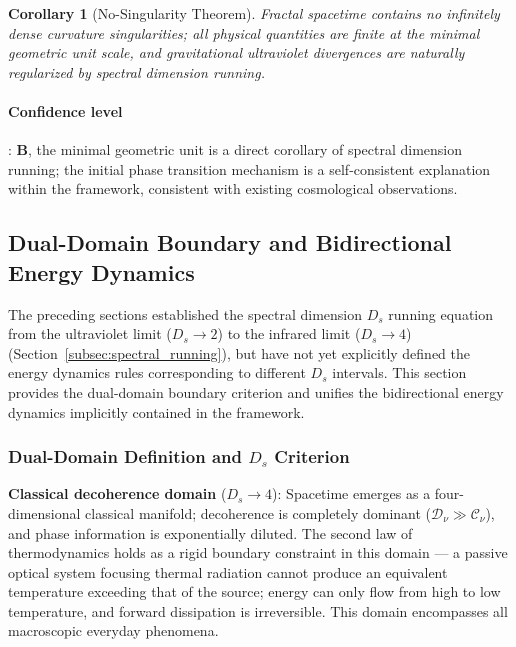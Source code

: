 \documentclass[12pt,a4paper,twocolumn]{article}
\newtheorem{corollary}[theorem]{Corollary}
\begin{document}
\begin{corollary}[No-Singularity Theorem]
Fractal spacetime contains no infinitely dense curvature singularities; all physical quantities are finite at the minimal geometric unit scale, and gravitational ultraviolet divergences are naturally regularized by spectral dimension running.
\end{corollary}

\paragraph{Confidence level}: \textbf{B}, the minimal geometric unit is a direct corollary of spectral dimension running; the initial phase transition mechanism is a self-consistent explanation within the framework, consistent with existing cosmological observations.

\subsection{Dual-Domain Boundary and Bidirectional Energy Dynamics}
\label{subsec:dual_domain}

The preceding sections established the spectral dimension $D_s$ running equation from the ultraviolet limit ($D_s\to 2$) to the infrared limit ($D_s\to 4$) (Section~\ref{subsec:spectral_running}), but have not yet explicitly defined the energy dynamics rules corresponding to different $D_s$ intervals. This section provides the dual-domain boundary criterion and unifies the bidirectional energy dynamics implicitly contained in the framework.

\subsubsection{Dual-Domain Definition and $D_s$ Criterion}

\textbf{Classical decoherence domain} ($D_s \to 4$): Spacetime emerges as a four-dimensional classical manifold; decoherence is completely dominant ($\mathcal{D}_\nu \gg \mathcal{C}_\nu$), and phase information is exponentially diluted. The second law of thermodynamics holds as a rigid boundary constraint in this domain --- a passive optical system focusing thermal radiation cannot produce an equivalent temperature exceeding that of the source; energy can only flow from high to low temperature, and forward dissipation is irreversible. This domain encompasses all macroscopic everyday phenomena.
\end{document}
